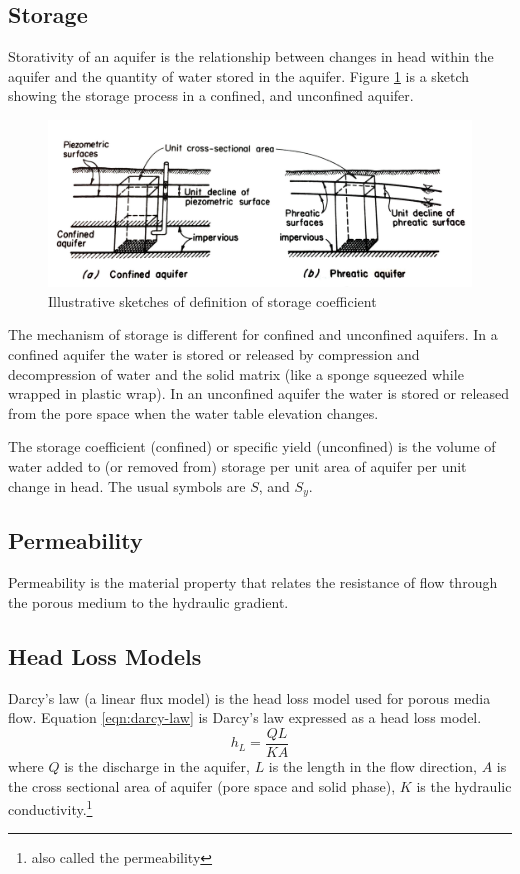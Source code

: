 \subsection{Storage}
Storativity of an aquifer is the relationship between changes in head within the aquifer and the quantity of water stored in the aquifer.
Figure \ref{fig:storage} is a sketch showing the storage process in a confined, and unconfined aquifer.
\begin{figure}[h!] %
   \centering
   \includegraphics[width=6in]{./16-PorousMediumFlow/storage.jpg} 
   \caption{Illustrative sketches of definition of storage coefficient}
   \label{fig:storage}
\end{figure}
\newline
The mechanism of storage is different for confined and unconfined aquifers.
In a confined aquifer the water is stored or released by compression and decompression of water and the solid matrix (like a sponge squeezed while wrapped in plastic wrap).
In an unconfined aquifer the water is stored or released from the pore space when the water table elevation changes.

The storage coefficient (confined) or specific yield (unconfined) is the volume of water added to (or removed from) storage per unit area of aquifer per unit change in head.  The usual symbols are $S$, and $S_y$.


\subsection{Permeability}
Permeability is the material property that relates the resistance of flow through the porous medium to the hydraulic gradient.

\subsection{Head Loss Models}
Darcy's law (a linear flux model) is the head loss model used for porous media flow.   
Equation \ref{eqn:darcy-law} is Darcy's law expressed as a head loss model.
\begin{equation}
h_L = \frac{QL}{KA}
\label{eqn:darcy-law}
\end{equation}
where $Q$ is the discharge in the aquifer, $L$ is the length in the flow direction, $A$ is the cross sectional area of aquifer (pore space and solid phase), $K$ is the hydraulic conductivity.\footnote{also called the permeability}

